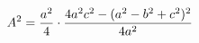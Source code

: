 \documentclass[preview]{standalone}
\begin{document}
\begin{align*}
\special{dvisvgm:raw <g id='unique000'>}A^2 = \frac{a^2}{4}\cdot\frac{4a^2c^2 - (a^2 - b^2 + c^2)^2}{4a^2}\special{dvisvgm:raw </g>}
\end{align*}
\end{document}
